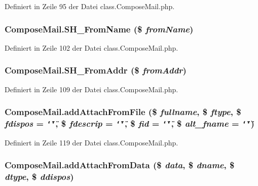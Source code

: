 Definiert in Zeile 95 der Datei class.ComposeMail.php.
\subsubsection{\setlength{\rightskip}{0pt plus 5cm}ComposeMail.SH\_\-FromName (\$ {\em fromName})}\label{classComposeMail_69832f1eed752913ff3613be56af1bd8}




Definiert in Zeile 102 der Datei class.ComposeMail.php.
\subsubsection{\setlength{\rightskip}{0pt plus 5cm}ComposeMail.SH\_\-FromAddr (\$ {\em fromAddr})}\label{classComposeMail_2a1a8c97d0d149e7735d3acc13829bdd}




Definiert in Zeile 109 der Datei class.ComposeMail.php.
\subsubsection{\setlength{\rightskip}{0pt plus 5cm}ComposeMail.addAttachFromFile (\$ {\em fullname}, \$ {\em ftype}, \$ {\em fdispos} = {\tt \char`\"{}\char`\"{}}, \$ {\em fdescrip} = {\tt \char`\"{}\char`\"{}}, \$ {\em fid} = {\tt \char`\"{}\char`\"{}}, \$ {\em alt\_\-fname} = {\tt \char`\"{}\char`\"{}})}\label{classComposeMail_9ad3d648129e039b220295baab64a5bc}




Definiert in Zeile 119 der Datei class.ComposeMail.php.
\subsubsection{\setlength{\rightskip}{0pt plus 5cm}ComposeMail.addAttachFromData (\$ {\em data}, \$ {\em dname}, \$ {\em dtype}, \$ {\em ddispos})}\label{classComposeMail_6080d36d8a5146f9568cfcb650de05fb}





